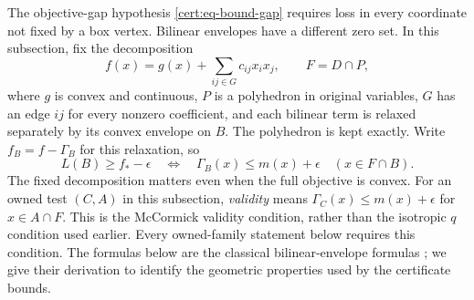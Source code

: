 The objective-gap hypothesis \cref{cert:eq-bound-gap} requires loss in
every coordinate not fixed by a box vertex. Bilinear envelopes have a
different zero set. In this subsection, fix the decomposition
\begin{equation}\label{geom:eq-mcc-model}
 f(x)=g(x)+\sum_{ij\in G}c_{ij}x_ix_j,
 \qquad F=D\cap P,
\end{equation}
where $g$ is convex and continuous, $P$ is a polyhedron in original
variables, $G$ has an edge $ij$ for every nonzero coefficient, and each
bilinear term is relaxed separately by its convex envelope on $B$.
The polyhedron is kept exactly. Write
$f_B=f-\Gamma_B$ for this relaxation, so
\begin{equation}\label{geom:eq-mcc-valid}
 L(B)\geq f_*-\epsilon\quad\Longleftrightarrow\quad
 \Gamma_B(x)\leq m(x)+\epsilon\quad(x\in F\cap B).
\end{equation}
The fixed decomposition matters even when the full objective is convex.
For an owned test $(C,A)$ in this subsection, \emph{validity} means
$\Gamma_C(x)\leq m(x)+\epsilon$ for $x\in A\cap F$. This is the
McCormick validity condition, rather than the isotropic $q$ condition
used earlier. Every owned-family statement below requires this condition.
The formulas below are the classical bilinear-envelope formulas
\citep{mccormick1976Computability}; we give their derivation to identify
the geometric properties used by the certificate bounds.

